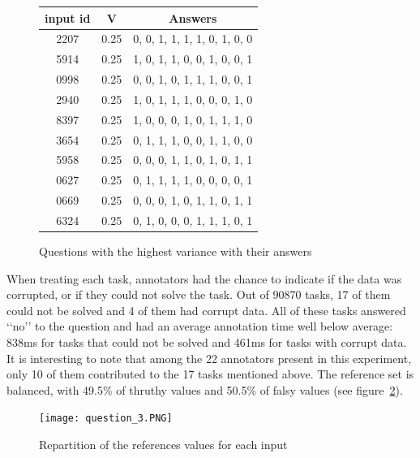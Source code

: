 \documentclass[letterpaper,12pt]{article}
\begin{document}
\renewcommand\thefigure{7}
\begin{figure}[hb] 
\centering
        \begin{tabular}{|ccc|} 
\hline
\multicolumn{1}{|c}{input id} & \multicolumn{1}{c}{V} & \multicolumn{1}{c|}{Answers} \\
\hline
2207 & 0.25 & 0, 0, 1, 1, 1, 1, 0, 1, 0, 0 \\
5914 & 0.25 & 1, 0, 1, 1, 0, 0, 1, 0, 0, 1 \\
0998 & 0.25 & 0, 0, 1, 0, 1, 1, 1, 0, 0, 1 \\
2940 & 0.25 & 1, 0, 1, 1, 1, 0, 0, 0, 1, 0 \\
8397 & 0.25 & 1, 0, 0, 0, 1, 0, 1, 1, 1, 0 \\
3654 & 0.25 & 0, 1, 1, 1, 0, 0, 1, 1, 0, 0 \\
5958 & 0.25 & 0, 0, 0, 1, 1, 0, 1, 0, 1, 1 \\
0627 & 0.25 & 0, 1, 1, 1, 1, 0, 0, 0, 0, 1 \\
0669 & 0.25 & 0, 0, 0, 1, 0, 1, 1, 0, 1, 1 \\
6324 & 0.25 & 0, 1, 0, 0, 0, 1, 1, 1, 0, 1 \\
\hline
\end{tabular}
        \caption{
                \label{fig:question_1_4}
                Questions with the highest variance with their answers
        }
\end{figure}

When treating each task, annotators had the chance to indicate if the data was corrupted, or if they could not solve the task.
Out of 90870 tasks, 17 of them could not be solved and 4 of them had corrupt data.
All of these tasks answered ‘‘no’’ to the question and had an average annotation time well below average: 838ms for tasks that could not be solved and 461ms for tasks with corrupt data.
It is interesting to note that among the 22 annotators present in this experiment, only 10 of them contributed to the 17 tasks mentioned above.
\newline
\newline
The reference set is balanced, with 49.5\% of thruthy values and 50.5\% of falsy values (see figure~\ref{fig:question_3}).

\renewcommand\thefigure{8}
\begin{figure}[hb] 
        \centering \texttt{[image: question\_3.PNG]}
        \caption{
                \label{fig:question_3}
                Repartition of the references values for each input
        }
\end{figure}
\end{document}

